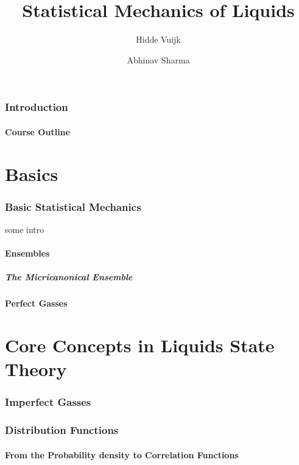 \documentclass[a4paper,11pt]{article}
\title{Statistical Mechanics of Liquids}
\author[a]{Hidde Vuijk}
\author[a,b]{Abhinav Sharma}
\affiliation[a]{Leibniz-Institut f\"ur Polymerforschung, Dresden, Germany}
\affiliation[b]{TU Dresden}
\begin{document}
 
\maketitle
\flushbottom

\newpage
\section{Introduction}
\subsection{Course Outline}
\newpage
\part{Basics}

\section{Basic Statistical Mechanics}\label{sec:basic}

some intro

\subsection{Ensembles}\label{sec:enembles}
\subsubsection{The Micricanonical Ensemble}
\subsection{Perfect Gasses}\label{sec:perfect}
\newpage


\part{Core Concepts in Liquids State Theory}
\section{Imperfect Gasses}\label{sec:imperfect}

\section{Distribution Functions}\label{sec:distribution}
\subsection{From the Probability density to Correlation Functions}

\end{document}
